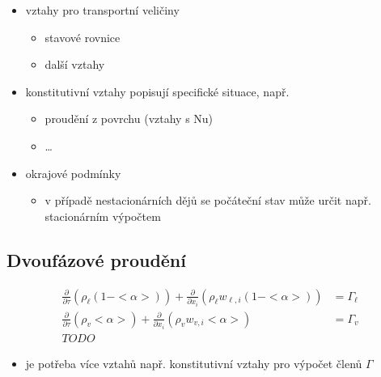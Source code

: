 \documentclass[letterpaper,10pt,czech]{sphinxmanual}
\begin{document}
\begin{itemize}
\item {} 
\sphinxAtStartPar
vztahy pro transportní veličiny
\begin{itemize}
\item {} 
\sphinxAtStartPar
stavové rovnice

\item {} 
\sphinxAtStartPar
další vztahy

\end{itemize}

\item {} 
\sphinxAtStartPar
konstitutivní vztahy \sphinxhyphen{} popisují specifické situace, např.
\begin{itemize}
\item {} 
\sphinxAtStartPar
proudění z povrchu (vztahy s Nu)

\item {} 
\sphinxAtStartPar
…

\end{itemize}

\item {} 
\sphinxAtStartPar
okrajové podmínky
\begin{itemize}
\item {} 
\sphinxAtStartPar
v případě nestacionárních dějů se počáteční stav může určit např. stacionárním výpočtem

\end{itemize}

\end{itemize}


\subsection{Dvoufázové proudění}
\label{\detokenize{prednaska_19092022:dvoufazove-proudeni}}\begin{equation*}
\begin{split}\frac{\partial}{\partial \tau}(\rho_\ell (1-<\alpha>)) + \frac{\partial}{\partial x_i}\left(\rho_\ell w_{\ell,i}(1-<\alpha>)\right) &= \Gamma_\ell \\
\frac{\partial}{\partial \tau}(\rho_v <\alpha>) + \frac{\partial}{\partial x_i}\left(\rho_v w_{v,i}<\alpha>\right) &= \Gamma_v \\
TODO
\end{split}
\end{equation*}\begin{itemize}
\item {} 
\sphinxAtStartPar
je potřeba více vztahů \textendash{} např. konstitutivní vztahy pro výpočet členů \(\Gamma\)

\end{itemize}
\end{document}
